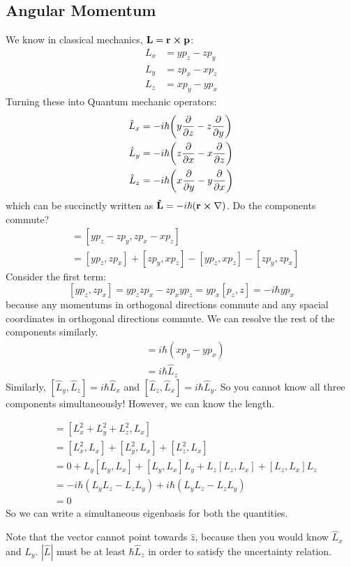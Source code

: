 \subsection{Angular Momentum}
We know in classical mechanics, $\mathbf{L} = \mathbf{r} \cross \mathbf{p}$:
\begin{align*}
    L_x &= y p_z - z p_y \\
    L_y &= z p_x - x p_z \\
    L_z &= x p_y - y p_x
\end{align*}
Turning these into Quantum mechanic operators:
\begin{align*}
    \hat{L}_x &= -i\hbar\qty(y \partialderivative{}{z} - z \partialderivative{}{y}) \\
    \hat{L}_y &= -i\hbar\qty(z \partialderivative{}{x} - x \partialderivative{}{z}) \\
    \hat{L}_z &= -i\hbar\qty(x \partialderivative{}{y} - y \partialderivative{}{x}) \\
\end{align*}
which can be succinctly written as $\mathbf{\hat{L}} = -i\hbar(\mathbf{r} \cross \nabla)$. Do the components commute?
\begin{align*}
    [\hat{L}_x, \hat{L}_y] &= [yp_z - z p_y, zp_x - x p_z] \\
    &= [y p_z, zp_x] + [zp_y, xp_z] - [y p_z, x p_z] - [zp_y, zp_x]
\end{align*}
Consider the first term:
\[ [y p_z, zp_x] = y p_z z p_x - z p_x y p_z = y p_x [p_z, z] = -i \hbar y p_x\]
because any momentums in orthogonal directions commute and any spacial coordinates in orthogonal directions commute.
We can resolve the rest of the components similarly.
\begin{align*}
    [\hat{L}_x, \hat{L}_y] &= i\hbar(x p_y - y p_x) \\
    &= i\hbar \hat{L}_z
\end{align*}
Similarly, $[\hat{L}_y, \hat{L}_z] = i\hbar\hat{L}_x$ and $[\hat{L}_z, \hat{L}_x] = i\hbar\hat{L}_y$. So you cannot know
all three components simultaneously! However, we can know the length.

\begin{align*}
    [L^2, L_x] &= [L_x^2 + L_y^2 + L_z^2, L_x] \\
    &= [L_x^2, L_x] + [L_y^2, L_x] + [L_z^2, L_x] \\
    &= 0 + L_y [L_y, L_x] + [L_y, L_x]L_y + L_z [L_z, L_x] + [L_z, L_x] L_z \\
    &= - i\hbar (L_y L_z - L_z L_y) + i\hbar (L_y L_z - L_z L_y) \\
    &= 0
\end{align*}
So we can write a simultaneous eigenbasis for both the quantities.

Note that the vector cannot point towards $\hat{z}$, because then you would know $\hat{L}_x$ and $\hat{L}_y$.
$|\hat{L}|$ must be at least $\hbar \hat{L}_z$ in order to satisfy the uncertainty relation.